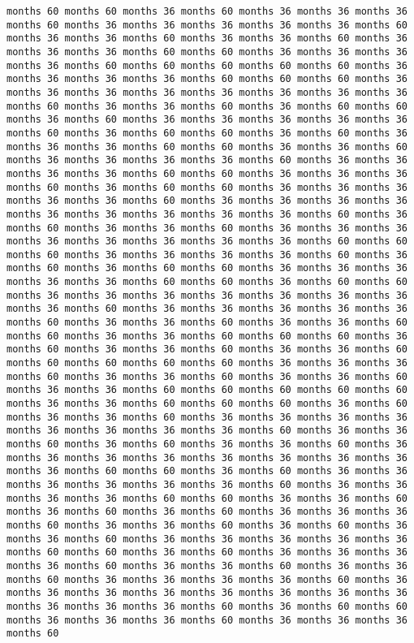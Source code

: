 \documentclass[11pt]{article}
\begin{document}
\begin{Verbatim}[commandchars=\\\{\}, frame=single, framerule=2mm, rulecolor=\color{outerrorbackground}]
months 60 months 60 months 36 months 60 months 36 months 36 months 36 months 60 months 36 months 36 months 36 months 36 months 36 months 60 months 36 months 36 months 60 months 36 months 36 months 60 months 36 months 36 months 36 months 60 months 60 months 36 months 36 months 36 months 36 months 60 months 60 months 60 months 60 months 60 months 36 months 36 months 36 months 36 months 60 months 60 months 60 months 36 months 36 months 36 months 36 months 36 months 36 months 36 months 36 months 60 months 36 months 36 months 60 months 36 months 60 months 60 months 36 months 60 months 36 months 36 months 36 months 36 months 36 months 60 months 36 months 60 months 60 months 36 months 60 months 36 months 36 months 36 months 60 months 60 months 36 months 36 months 60 months 36 months 36 months 36 months 36 months 60 months 36 months 36 months 36 months 36 months 60 months 60 months 36 months 36 months 36 months 60 months 36 months 60 months 60 months 36 months 36 months 36 months 36 months 36 months 60 months 36 months 36 months 36 months 36 months 36 months 36 months 36 months 36 months 36 months 60 months 36 months 60 months 36 months 36 months 60 months 36 months 36 months 36 months 36 months 36 months 36 months 36 months 36 months 60 months 60 months 60 months 36 months 36 months 36 months 36 months 60 months 36 months 60 months 36 months 60 months 60 months 36 months 36 months 36 months 36 months 36 months 60 months 60 months 36 months 60 months 60 months 36 months 36 months 36 months 36 months 36 months 36 months 36 months 36 months 60 months 36 months 36 months 36 months 36 months 36 months 60 months 36 months 36 months 60 months 36 months 36 months 60 months 60 months 36 months 36 months 60 months 60 months 60 months 36 months 60 months 36 months 36 months 60 months 36 months 36 months 60 months 60 months 60 months 60 months 60 months 36 months 36 months 36 months 60 months 36 months 36 months 60 months 36 months 36 months 60 months 36 months 36 months 60 months 60 months 60 months 60 months 60 months 36 months 36 months 60 months 60 months 60 months 36 months 60 months 36 months 36 months 60 months 36 months 36 months 36 months 36 months 36 months 36 months 36 months 36 months 60 months 36 months 36 months 60 months 36 months 60 months 36 months 36 months 60 months 36 months 36 months 36 months 36 months 36 months 36 months 36 months 36 months 36 months 60 months 60 months 36 months 60 months 36 months 36 months 36 months 36 months 36 months 36 months 60 months 36 months 36 months 36 months 36 months 60 months 60 months 36 months 36 months 60 months 36 months 60 months 36 months 60 months 36 months 36 months 36 months 60 months 36 months 36 months 60 months 36 months 60 months 36 months 36 months 60 months 36 months 36 months 36 months 36 months 36 months 60 months 60 months 36 months 60 months 36 months 36 months 36 months 36 months 60 months 36 months 36 months 60 months 36 months 36 months 60 months 36 months 36 months 36 months 36 months 60 months 36 months 36 months 36 months 36 months 36 months 36 months 36 months 36 months 36 months 36 months 36 months 60 months 36 months 60 months 60 months 36 months 36 months 36 months 60 months 36 months 36 months 36 months 60 
\end{Verbatim}
\end{document}
